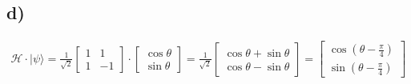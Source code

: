 \subsection*{d)}
\begin{align*}
    \mathcal{H}\cdot|\psi\rangle = \frac{1}{\sqrt{2}}\begin{bmatrix}
        1 & 1 \\
        1 & -1
    \end{bmatrix}\cdot\begin{bmatrix}
        \cos\theta \\
        \sin\theta
    \end{bmatrix}
    = \frac{1}{\sqrt{2}}\begin{bmatrix}
        \cos\theta + \sin\theta \\
        \cos\theta - \sin\theta
    \end{bmatrix}
    = \begin{bmatrix}
        \cos(\theta - \frac{\pi}{4}) \\
        \sin(\theta - \frac{\pi}{4})
    \end{bmatrix}
\end{align*}